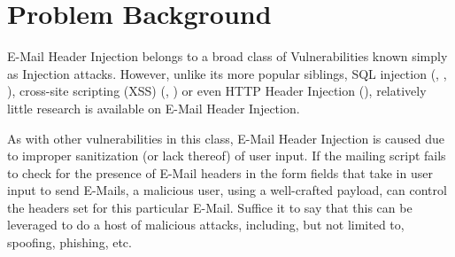 \section{Problem Background}

E-Mail Header Injection belongs to a broad class of Vulnerabilities known simply as Injection attacks. However, unlike its more popular siblings, SQL injection (\cite{sql1}, \cite{sql0}, \cite{sql2}), cross-site scripting (XSS) (\cite{Injection1}, \cite{KleinAmit}) or even HTTP Header Injection (\cite{sessionride}), relatively little research is available on E-Mail Header Injection.

As with other vulnerabilities in this class, E-Mail Header Injection is caused due to improper sanitization (or lack thereof) of user input. If the mailing script fails to check for the presence of E-Mail headers in the form fields that take in user input to send E-Mails, a malicious user, using a well-crafted payload, can control the headers set for this particular E-Mail. Suffice it to say that this can be leveraged to do a host of malicious attacks, including, but not limited to, spoofing, phishing, etc.